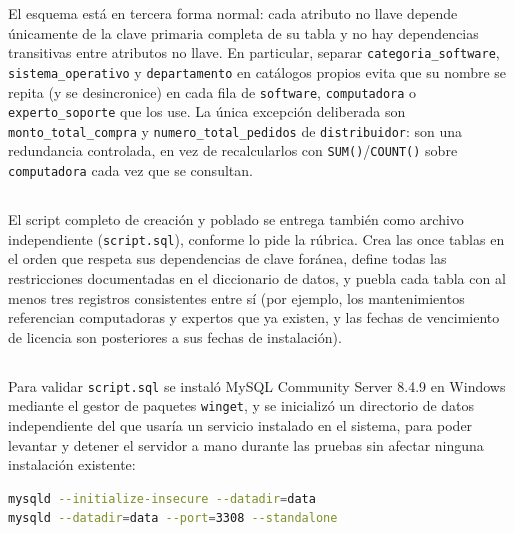 \documentclass[10pt,a4paper]{article}
\begin{document}
El esquema está en tercera forma normal: cada atributo no llave depende únicamente de la clave primaria completa de su tabla y no hay dependencias transitivas entre atributos no llave. En particular, separar \texttt{categoria\_software}, \texttt{sistema\_operativo} y \texttt{departamento} en catálogos propios evita que su nombre se repita (y se desincronice) en cada fila de \texttt{software}, \texttt{computadora} o \texttt{experto\_soporte} que los use. La única excepción deliberada son \texttt{monto\_total\_compra} y \texttt{numero\_total\_pedidos} de \texttt{distribuidor}: son una redundancia controlada, en vez de recalcularlos con \texttt{SUM()}/\texttt{COUNT()} sobre \texttt{computadora} cada vez que se consultan.

\subsection{ \color{colorESCOM}{Script SQL}}

El script completo de creación y poblado se entrega también como archivo independiente (\texttt{script.sql}), conforme lo pide la rúbrica. Crea las once tablas en el orden que respeta sus dependencias de clave foránea, define todas las restricciones documentadas en el diccionario de datos, y puebla cada tabla con al menos tres registros consistentes entre sí (por ejemplo, los mantenimientos referencian computadoras y expertos que ya existen, y las fechas de vencimiento de licencia son posteriores a sus fechas de instalación).



\subsection{ \color{colorESCOM}{Instalación y ejecución del entorno de prueba}}

Para validar \texttt{script.sql} se instaló MySQL Community Server 8.4.9 en Windows mediante el gestor de paquetes \texttt{winget}, y se inicializó un directorio de datos independiente del que usaría un servicio instalado en el sistema, para poder levantar y detener el servidor a mano durante las pruebas sin afectar ninguna instalación existente:

\begin{lstlisting}[language=bash, caption={Inicialización y arranque del servidor MySQL de prueba}]
mysqld --initialize-insecure --datadir=data
mysqld --datadir=data --port=3308 --standalone
\end{lstlisting}
\end{document}

